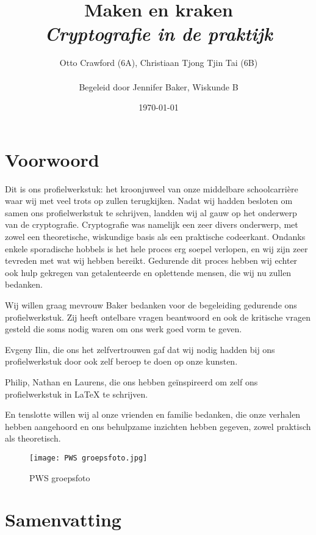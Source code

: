 \documentclass{report} %
\title{{\huge Maken en kraken}\\\textit{\Large Cryptografie in de praktijk}\\\vspace{1cm}{\texttt{[image: images/XKCD.png]}}}
\author{{Otto Crawford (6A), Christiaan Tjong Tjin Tai (6B)}\\ \\{Begeleid door Jennifer Baker, Wiskunde B}}
\date{\today}
\begin{document}
\maketitle

\tableofcontents

\chapter{Voorwoord}
Dit is ons profielwerkstuk: het kroonjuweel van onze middelbare schoolcarrière waar wij met veel trots op zullen terugkijken. Nadat wij hadden besloten om samen ons profielwerkstuk te schrijven, landden wij al gauw op het onderwerp van de cryptografie. Cryptografie was namelijk een zeer divers onderwerp, met zowel een theoretische, wiskundige basis als een praktische codeerkant. Ondanks enkele sporadische hobbels is het hele proces erg soepel verlopen, en wij zijn zeer tevreden met wat wij hebben bereikt. Gedurende dit proces hebben wij echter ook hulp gekregen van getalenteerde en oplettende mensen, die wij nu zullen bedanken.
\par Wij willen graag mevrouw Baker bedanken voor de begeleiding gedurende ons profielwerkstuk. Zij heeft ontelbare vragen beantwoord en ook de kritische vragen gesteld die soms nodig waren om ons werk goed vorm te geven.
\par Evgeny Ilin, die ons het zelfvertrouwen gaf dat wij nodig hadden bij ons profielwerkstuk door ook zelf beroep te doen op onze kunsten.
\par Philip, Nathan en Laurens, die ons hebben geïnspireerd om zelf ons profielwerkstuk in \LaTeX\,\,te schrijven.
\par En tenslotte willen wij al onze vrienden en familie bedanken, die onze verhalen hebben aangehoord en ons behulpzame inzichten hebben gegeven, zowel praktisch als theoretisch.
\begin{figure}[h!]
    \centering
    \texttt{[image: PWS groepsfoto.jpg]}
    \caption{PWS groepsfoto}
    \label{fig:PWS_Groepsfoto}
\end{figure}

\chapter{Samenvatting}
\end{document}
